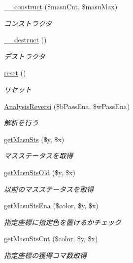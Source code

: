 \begin{DoxyCompactItemize}
\item 
\hyperlink{class_reversi_a6667ca490c75777ec233f3ead04c5fd7}{\+\_\+\+\_\+construct} (\$masu\+Cnt, \$masu\+Max)
\begin{DoxyCompactList}\small\item\em コンストラクタ \end{DoxyCompactList}\item 
\hyperlink{class_reversi_a421831a265621325e1fdd19aace0c758}{\+\_\+\+\_\+destruct} ()
\begin{DoxyCompactList}\small\item\em デストラクタ \end{DoxyCompactList}\item 
\hyperlink{class_reversi_a4a20559544fdf4dcb457e258dc976cf8}{reset} ()
\begin{DoxyCompactList}\small\item\em リセット \end{DoxyCompactList}\item 
\hyperlink{class_reversi_ae15e49622562732d31d44a75a14c3b45}{Analysis\+Reversi} (\$b\+Pass\+Ena, \$w\+Pass\+Ena)
\begin{DoxyCompactList}\small\item\em 解析を行う \end{DoxyCompactList}\item 
\hyperlink{class_reversi_a1baed538e7a503cd51850d368b9e65f7}{get\+Masu\+Sts} (\$y, \$x)
\begin{DoxyCompactList}\small\item\em マスステータスを取得 \end{DoxyCompactList}\item 
\hyperlink{class_reversi_a1688a929d3917e19510f6501c42d6a2b}{get\+Masu\+Sts\+Old} (\$y, \$x)
\begin{DoxyCompactList}\small\item\em 以前のマスステータスを取得 \end{DoxyCompactList}\item 
\hyperlink{class_reversi_a22088e18c7f837f49093595261c30e4e}{get\+Masu\+Sts\+Ena} (\$color, \$y, \$x)
\begin{DoxyCompactList}\small\item\em 指定座標に指定色を置けるかチェック \end{DoxyCompactList}\item 
\hyperlink{class_reversi_a10bfc13effc2db9a681a2906792be453}{get\+Masu\+Sts\+Cnt} (\$color, \$y, \$x)
\begin{DoxyCompactList}\small\item\em 指定座標の獲得コマ数取得 \end{DoxyCompactList}\item 

\end{DoxyCompactItemize}
